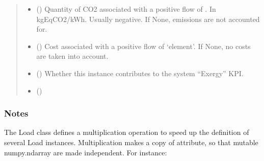 \documentclass[letterpaper,10pt,english]{sphinxmanual}
\begin{document}
\begin{fulllineitems}
\begin{fulllineitems}
\begin{quote}
\begin{description}
\begin{itemize}
\item {} 
\sphinxAtStartPar
{} (\sphinxstyleliteralemphasis{\sphinxupquote{, }}\sphinxstyleliteralemphasis{\sphinxupquote{, }}) \textendash{} Quantity of CO2 associated with a positive flow of .
In kgEqCO2/kWh.
Usually negative.
If None, emissions are not accounted for.

\item {} 
\sphinxAtStartPar
{} ({\hyperref[\detokenize{generated/tamos.elementIO.Cost:tamos.elementIO.Cost}]{}}\sphinxstyleliteralemphasis{\sphinxupquote{, }}) \textendash{} Cost associated with a positive flow of ‘element’.
If None, no costs are taken into account.

\item {} 
\sphinxAtStartPar
{} (\sphinxstyleliteralemphasis{\sphinxupquote{, }}\sphinxstyleliteralemphasis{\sphinxupquote{, }}) \textendash{} Whether this instance contributes to the system “Exergy” KPI.

\item {} 
\sphinxAtStartPar
{} (\sphinxstyleliteralemphasis{\sphinxupquote{, }}) \textendash{} 

\end{itemize}

\end{description}\end{quote}
\subsubsection*{Notes}

\sphinxAtStartPar
The Load class defines a multiplication operation to speed up the definition of several Load instances.
Multiplication makes a copy of  attribute, so that mutable numpy.ndarray are made independent.
For instance:


\end{fulllineitems}
\end{fulllineitems}
\end{document}
